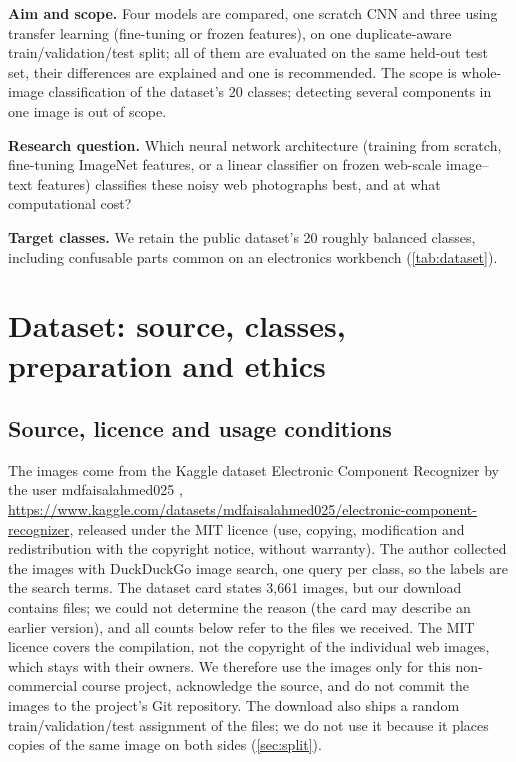 \documentclass[11pt,a4paper]{article}
\begin{document}
\textbf{Aim and scope.} Four models are compared, one scratch CNN and three using transfer learning
(fine-tuning or frozen features), on one duplicate-aware train/validation/test split; all of them are evaluated on the same held-out test set,
their differences are explained and one is recommended. The scope is whole-image classification of the dataset's 20 classes;
detecting several components in one image is out of scope.

\textbf{Research question.} Which neural network architecture (training from scratch, fine-tuning
ImageNet features, or a linear classifier on frozen web-scale image--text features) classifies these
noisy web photographs best, and at what computational cost?

\textbf{Target classes.} We retain the public dataset's 20 roughly balanced classes, including confusable
parts common on an electronics workbench (\cref{tab:dataset}).

\section{Dataset: source, classes, preparation and ethics}\label{sec:data}

\subsection{Source, licence and usage conditions}\label{sec:source}
The images come from the Kaggle dataset Electronic Component Recognizer by the user
mdfaisalahmed025 \citep{kaggle_dataset},
\url{https://www.kaggle.com/datasets/mdfaisalahmed025/electronic-component-recognizer}, released under the
MIT licence (use, copying, modification and redistribution with the copyright notice, without warranty).
The author collected the images with DuckDuckGo image search, one query per class, so the labels are the
search terms. The dataset card states 3,661 images, but our download contains \nRaw files; we could not determine
the reason (the card may describe an earlier version), and all counts below refer to the files we received. The MIT
licence covers the compilation, not the copyright of the individual web images, which stays with their owners. We
therefore use the images only for this non-commercial course project, acknowledge the source, and do not commit the
images to the project's Git repository. The download also ships a random train/validation/test assignment of the
files; we do not use it because it places copies of the same image on both sides (\cref{sec:split}).
\end{document}
